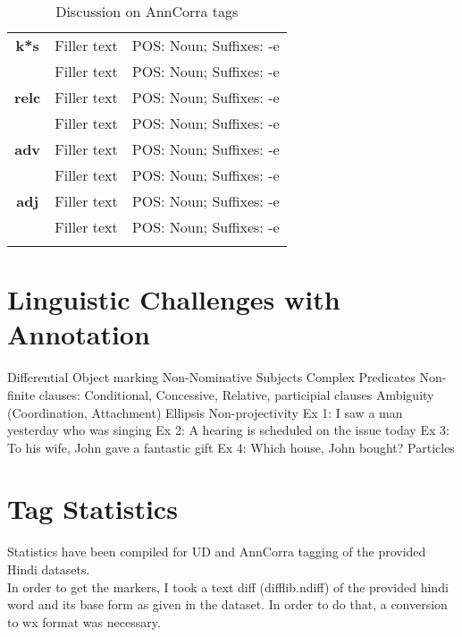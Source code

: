 \documentclass[a4 paper]{article}
\begin{document}
\begin{longtable}{cp{}p{}}
    \midrule
    \addlinespace[0.5em]
    \textbf{k*s}
                 & Filler text
                 & POS: Noun; Suffixes: -e\\
    \addlinespace[0.5em]
                 & Filler text
                 & POS: Noun; Suffixes: -e\\
    \midrule
    \addlinespace[0.5em]
    \textbf{relc}
                 & Filler text
                 & POS: Noun; Suffixes: -e\\
    \addlinespace[0.5em]
                 & Filler text
                 & POS: Noun; Suffixes: -e\\
    \midrule
    \addlinespace[0.5em]
    \textbf{adv}
                 & Filler text
                 & POS: Noun; Suffixes: -e\\
    \addlinespace[0.5em]
                 & Filler text
                 & POS: Noun; Suffixes: -e\\
    \midrule
    \addlinespace[0.5em]
    \textbf{adj}
                 & Filler text
                 & POS: Noun; Suffixes: -e\\
    \addlinespace[0.5em]
                 & Filler text
                 & POS: Noun; Suffixes: -e\\
    \midrule
\caption{Discussion on AnnCorra tags}
\label{tab:anncorratable}
\end{longtable}

\section{Linguistic Challenges with Annotation}

 Differential Object marking
 Non-Nominative Subjects
 Complex Predicates
 Non-finite clauses: Conditional, Concessive, Relative, participial clauses
 Ambiguity (Coordination, Attachment)
 Ellipsis
 Non-projectivity
	Ex 1: I saw a man yesterday who was singing
	Ex 2: A hearing is scheduled on the issue today
	Ex 3: To his wife, John gave a fantastic gift
	Ex 4: Which house, John bought?
 Particles

\section{Tag Statistics}

Statistics have been compiled for UD and AnnCorra tagging of the provided Hindi
datasets.\\
In order to get the markers, I took a text diff (difflib.ndiff) of the provided
hindi word and its base form as given in the dataset. In order to do that, a
conversion to wx format was necessary.
\end{document}
